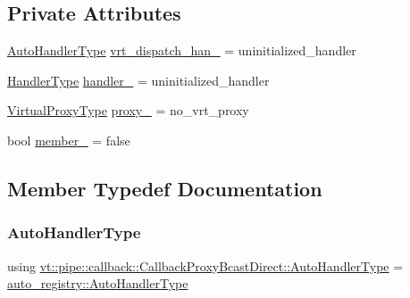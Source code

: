 \subsection*{Private Attributes}
\begin{DoxyCompactItemize}
\item 
\hyperlink{structvt_1_1pipe_1_1callback_1_1_callback_proxy_bcast_direct_a543cd86434430bd048952534f4fbc128}{Auto\+Handler\+Type} \hyperlink{structvt_1_1pipe_1_1callback_1_1_callback_proxy_bcast_direct_abbf88c330fa96ba4da3dae7f207a1641}{vrt\+\_\+dispatch\+\_\+han\+\_\+} = uninitialized\+\_\+handler
\item 
\hyperlink{namespacevt_af64846b57dfcaf104da3ef6967917573}{Handler\+Type} \hyperlink{structvt_1_1pipe_1_1callback_1_1_callback_proxy_bcast_direct_ab2e4eab888ffc3de18261f753f7e404a}{handler\+\_\+} = uninitialized\+\_\+handler
\item 
\hyperlink{namespacevt_a1b417dd5d684f045bb58a0ede70045ac}{Virtual\+Proxy\+Type} \hyperlink{structvt_1_1pipe_1_1callback_1_1_callback_proxy_bcast_direct_a7af23d7b32e39f4dbcfe35b5acb31f26}{proxy\+\_\+} = no\+\_\+vrt\+\_\+proxy
\item 
bool \hyperlink{structvt_1_1pipe_1_1callback_1_1_callback_proxy_bcast_direct_aa1d50b25379c9eb9dbe76932e4453190}{member\+\_\+} = false
\end{DoxyCompactItemize}


\subsection{Member Typedef Documentation}
\mbox{\label{structvt_1_1pipe_1_1callback_1_1_callback_proxy_bcast_direct_a543cd86434430bd048952534f4fbc128}} 
\subsubsection{\texorpdfstring{Auto\+Handler\+Type}{AutoHandlerType}}
{\footnotesize\ttfamily using \hyperlink{structvt_1_1pipe_1_1callback_1_1_callback_proxy_bcast_direct_a543cd86434430bd048952534f4fbc128}{vt\+::pipe\+::callback\+::\+Callback\+Proxy\+Bcast\+Direct\+::\+Auto\+Handler\+Type} =  \hyperlink{namespacevt_1_1auto__registry_ae295e18699146815bb7d7674594d95d7}{auto\+\_\+registry\+::\+Auto\+Handler\+Type}}



